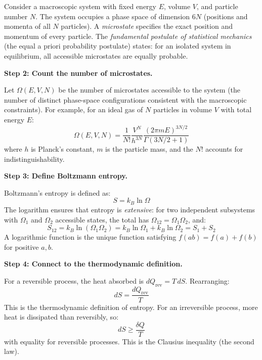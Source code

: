 Consider a macroscopic system with fixed energy $E$, volume $V$, and particle number $N$. The system occupies a phase space of dimension $6N$ (positions and momenta of all $N$ particles). A \emph{microstate} specifies the exact position and momentum of every particle. The \emph{fundamental postulate of statistical mechanics} (the equal a priori probability postulate) states: for an isolated system in equilibrium, all accessible microstates are equally probable.

\textbf{Step 2: Count the number of microstates.}

Let $\Omega(E, V, N)$ be the number of microstates accessible to the system (the number of distinct phase-space configurations consistent with the macroscopic constraints). For example, for an ideal gas of $N$ particles in volume $V$ with total energy $E$:
\begin{equation}
\Omega(E, V, N) = \frac{1}{N!}\frac{V^N}{h^{3N}}\frac{(2\pi m E)^{3N/2}}{\Gamma(3N/2 + 1)}
\end{equation}
where $h$ is Planck's constant, $m$ is the particle mass, and the $N!$ accounts for indistinguishability.

\textbf{Step 3: Define Boltzmann entropy.}

Boltzmann's entropy is defined as:
\begin{equation}
S = k_B \ln \Omega
\end{equation}
The logarithm ensures that entropy is \emph{extensive}: for two independent subsystems with $\Omega_1$ and $\Omega_2$ accessible states, the total has $\Omega_{12} = \Omega_1 \Omega_2$, and:
\begin{equation}
S_{12} = k_B \ln(\Omega_1\Omega_2) = k_B\ln\Omega_1 + k_B\ln\Omega_2 = S_1 + S_2
\end{equation}
A logarithmic function is the unique function satisfying $f(ab) = f(a) + f(b)$ for positive $a, b$.

\textbf{Step 4: Connect to the thermodynamic definition.}

For a reversible process, the heat absorbed is $dQ_{\text{rev}} = T\,dS$. Rearranging:
\begin{equation}
dS = \frac{dQ_{\text{rev}}}{T}
\end{equation}
This is the thermodynamic definition of entropy. For an irreversible process, more heat is dissipated than reversibly, so:
\begin{equation}
dS \geq \frac{\delta Q}{T}
\end{equation}
with equality for reversible processes. This is the Clausius inequality (the second law).

